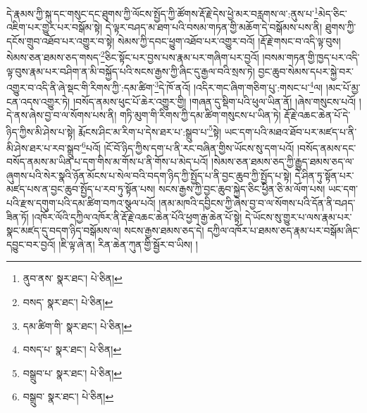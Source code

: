 དེ་རྣམས་ཀྱི་སྐུ་དང་གསུང་དང་ཐུགས་ཀྱི་ལོངས་སྤྱོད་ཀྱི་ཚོགས་རྡོ་རྗེ་དེས་ཕྱེ་མར་བརླགས་ལ་:ནུས་པ་\footnote{ནུབ་ནས་  སྣར་ཐང་།  པེ་ཅིན། }མེད་ཅིང་འཇིག་པར་གྱུར་པར་བསྒོམ་སྟེ། དེ་ལྟར་བཤད་མ་ཐག་པའི་བསམ་གཏན་གྱི་མཆོག་དེ་བསྒོམས་པས་ནི། ཐུགས་ཀྱི་དངོས་གྲུབ་འཐོབ་པར་འགྱུར་བ་སྟེ། སེམས་ཀྱི་དབང་ཕྱུག་འཐོབ་པར་འགྱུར་བའོ། །རྡོ་རྗེ་གསང་བ་འདི་ལྟ་བུས། སེམས་ཅན་ཐམས་ཅད་གསད་\footnote{བསད་  སྣར་ཐང་།  པེ་ཅིན། }ཅིང་སྟོང་པར་བྱས་པས་རྣམ་པར་གཞིག་པར་བྱའོ། །བསམ་གཏན་གྱི་ཁྱད་པར་འདི་ལྟ་བུས་རྣམ་པར་བཤིག་ན་མི་བསྐྱོད་པའི་སངས་རྒྱས་ཀྱི་ཞིང་དུ་རྒྱལ་བའི་སྲས་ཏེ། བྱང་ཆུབ་སེམས་དཔར་སྐྱེ་བར་འགྱུར་བ་འདི་ནི་ཞེ་སྡང་གི་རིགས་ཀྱི་:དམ་ཚིག་\footnote{དམ་ཚིག་གི་  སྣར་ཐང་།  པེ་ཅིན། }དེ་ཁོ་ནའོ། །འདིར་གང་ཞིག་གཅིག་པུ་:གསང་པ་\footnote{བསད་པ་  སྣར་ཐང་།  པེ་ཅིན། }ལ། །མང་པོ་མྱ་ངན་འདས་འགྱུར་ཏེ། །བསོད་ནམས་ཕུང་པོ་ཆེར་འགྱུར་གྱི། །གཞན་དུ་སྡིག་པའི་ཕུལ་ཡིན་ནོ། །ཞེས་གསུངས་པའོ། །དེ་ནས་ཞེས་བྱ་བ་ལ་སོགས་པས་ནི། གཏི་མུག་གི་རིགས་ཀྱི་དམ་ཚིག་གསུངས་པ་ཡིན་ཏེ། རྡོ་རྗེ་འཆང་ཆེན་པོ་དེ་ཉིད་ཀྱིས་མི་ཤེས་པ་སྟེ། རྨོངས་ཤིང་མ་རིག་པ་དེས་ཐར་པ་:སྒྲུབ་པ་\footnote{བསྒྲུབ་པ་  སྣར་ཐང་།  པེ་ཅིན། }སྟེ། ཡང་དག་པའི་མཐའ་ཐོབ་པར་མཛད་པ་ནི་མི་ཤེས་ཐར་པ་རབ་སྒྲུབ་\footnote{བསྒྲུབ་  སྣར་ཐང་།  པེ་ཅིན། }པའོ། །ངོ་བོ་ཉིད་ཀྱིས་དག་པ་ནི་རང་བཞིན་གྱིས་ཡོངས་སུ་དག་པའོ། །བསོད་ནམས་དང་བསོད་ནམས་མ་ཡིན་པ་དག་གིས་མ་གོས་པ་ནི་གོས་པ་མེད་པའོ། །སེམས་ཅན་ཐམས་ཅད་ཀྱི་རྒྱུད་ཐམས་ཅད་ལ་ཞུགས་པའི་སེར་སྣའི་ཉོན་མོངས་པ་སེལ་བའི་བདག་ཉིད་ཀྱི་སྤྱོད་པ་ནི་བྱང་ཆུབ་ཀྱི་སྤྱོད་པ་སྟེ། དེ་ཤིན་ཏུ་སྟོན་པར་མཛད་པས་ན་བྱང་ཆུབ་སྤྱོད་པ་རབ་ཏུ་སྟོན་པས། སངས་རྒྱས་ཀྱི་བྱང་ཆུབ་སྐྱེད་ཅིང་ཕྱིན་ཅི་མ་ལོག་པས། ཡང་དག་པའི་རྫས་དགུག་པའི་དམ་ཚིག་བཀའ་སྩལ་པའོ། །ནམ་མཁའི་དབྱིངས་ཀྱི་ཞེས་བྱ་བ་ལ་སོགས་པའི་དོན་ནི་བཤད་ཟིན་ཏོ། །འཁོར་ལོའི་དཀྱིལ་འཁོར་ནི་རྡོ་རྗེ་འཆང་ཆེན་པོའི་ཕྱག་རྒྱ་ཆེན་པོ་སྟེ། དེ་ཡོངས་སུ་གྱུར་པ་ལས་རྣམ་པར་སྣང་མཛད་དུ་བདག་ཉིད་བསྒོམས་ལ། སངས་རྒྱས་ཐམས་ཅད་དེ། དཀྱིལ་འཁོར་པ་ཐམས་ཅད་རྣམ་པར་བསྒོམ་ཞིང་དབྱུང་བར་བྱའོ། །ཇི་ལྟ་ཞེ་ན། རིན་ཆེན་ཀུན་གྱི་སྦྱོར་བ་ཡིས། །

